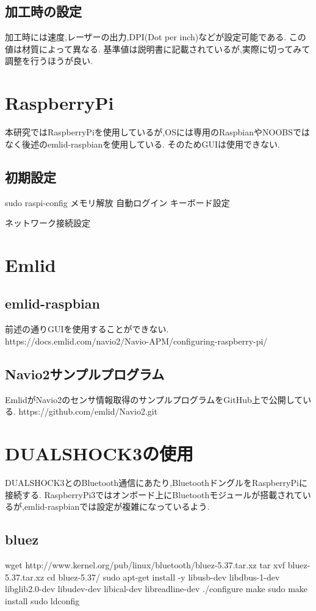 \documentclass[12pt,oneside]{sotsuken_paper}
\begin{document}
\subsection{加工時の設定}
加工時には速度,レーザーの出力,DPI(Dot per inch)などが設定可能である.
この値は材質によって異なる.
基準値は説明書に記載されているが,実際に切ってみて調整を行うほうが良い.

\section{RaspberryPi}
本研究ではRaspberryPiを使用しているが,OSには専用のRaspbianやNOOBSではなく後述のemlid-raspbianを使用している.
そのためGUIは使用できない.

\subsection{初期設定}
sudo raspi-config
メモリ解放
自動ログイン
キーボード設定

ネットワーク接続設定

\section{Emlid}

\subsection{emlid-raspbian}
前述の通りGUIを使用することができない.
https://docs.emlid.com/navio2/Navio-APM/configuring-raspberry-pi/

\subsection{Navio2サンプルプログラム}
EmlidがNavio2のセンサ情報取得のサンプルプログラムをGitHub上で公開している.
https://github.com/emlid/Navio2.git

\section{DUALSHOCK3の使用}
DUALSHOCK3とのBluetooth通信にあたり,BluetoothドングルをRaspberryPiに接続する.
RaspberryPi3ではオンボード上にBluetoothモジュールが搭載されているが,emlid-raspbianでは設定が複雑になっているよう.

\subsection{bluez}
wget http://www.kernel.org/pub/linux/bluetooth/bluez-5.37.tar.xz
tar xvf bluez-5.37.tar.xz
cd bluez-5.37/
sudo apt-get install -y libusb-dev libdbus-1-dev libglib2.0-dev libudev-dev libical-dev libreadline-dev
./configure
make
sudo make install
sudo ldconfig
\end{document}
